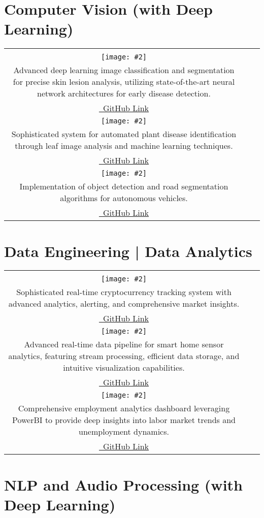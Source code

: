\documentclass[b3paper]{article}
\makeatletter
\newcommand{\projectrow}[3]{%
    \begin{center}
    \begin{tabular}{@{}c@{\hspace{0.5cm}}c@{\hspace{0.5cm}}c@{}}
    #1 & #2 & #3
    \end{tabular}
    \end{center}
}
\newcommand{\cvprojectbox}[4]{%
    \begin{tcolorbox}[
        colback=boxcolor,
        width=0.32\textwidth,
        height=12.5cm,  %
        arc=5pt,
        box align=top,
        nobeforeafter,
        sharp corners=northwest
    ]
        \centering
        \fontsize{18pt}{20pt}\selectfont\textbf{#1}\\[0.5cm]
        \texttt{[image: \#2]}\\[0.3cm]
        \fontsize{14pt}{16pt}\selectfont #3\par
        \\[0.3cm]
        \href{#4}{\faGithub\ GitHub Link}
    \end{tcolorbox}%
}
\newcommand{\dataprojectbox}[4]{%
    \begin{tcolorbox}[
        colback=boxcolor,
        width=0.32\textwidth,
        height=15.5cm,  %
        arc=5pt,
        box align=top,
        nobeforeafter,
        sharp corners=northwest
    ]
        \centering
        \fontsize{18pt}{20pt}\selectfont\textbf{#1}\\[0.5cm]
        \texttt{[image: \#2]}\\[0.3cm]
        \fontsize{14pt}{16pt}\selectfont #3\par
        \\[0.3cm]
        \href{#4}{\faGithub\ GitHub Link}
    \end{tcolorbox}%
}
\makeatother
\begin{document}
\section*{\LARGE{Computer Vision (with Deep Learning)}}

\projectrow
{\cvprojectbox{Skin Cancer Detection}{assets/skin_cancer.png}
{Advanced deep learning image classification and segmentation for precise skin lesion analysis, utilizing state-of-the-art neural network architectures for early disease detection.}
{https://github.com/soheil-mp/Skin-cancer-recoginition}}
{\cvprojectbox{Plant Health Detector}{assets/plant_health.png}
{Sophisticated system for automated plant disease identification through leaf image analysis and machine learning techniques.}
{https://github.com/soheil-mp/Plant-Health-Detector}}
{\cvprojectbox{CV for Autonomous Driving}{assets/autonomous_driving.png}
{Implementation of object detection and road segmentation algorithms for autonomous vehicles.}
{https://github.com/soheil-mp/cv-for-autonomous-driving}}

\section*{\LARGE{Data Engineering | Data Analytics}}

\projectrow
{\dataprojectbox{Crypto Price Monitoring}{assets/crypto_monitoring.png}
{Sophisticated real-time cryptocurrency tracking system with advanced analytics, alerting, and comprehensive market insights.}
{https://github.com/soheil-mp/Crypto-Price-Monitoring-System}}
{\dataprojectbox{IoT Smart Home Dashboard}{assets/iot_dashboard.png}
{Advanced real-time data pipeline for smart home sensor analytics, featuring stream processing, efficient data storage, and intuitive visualization capabilities.}
{https://github.com/soheil-mp/IoT-Smart-Home-Data-Pipeline}}
{\dataprojectbox{Employment Monitoring}{assets/employment_dashboard.png}
{Comprehensive employment analytics dashboard leveraging PowerBI to provide deep insights into labor market trends and unemployment dynamics.}
{https://github.com/soheil-mp/unemployment-dashboard-powerbi}}

\section*{\LARGE{NLP and Audio Processing (with Deep Learning)}}
\end{document}
